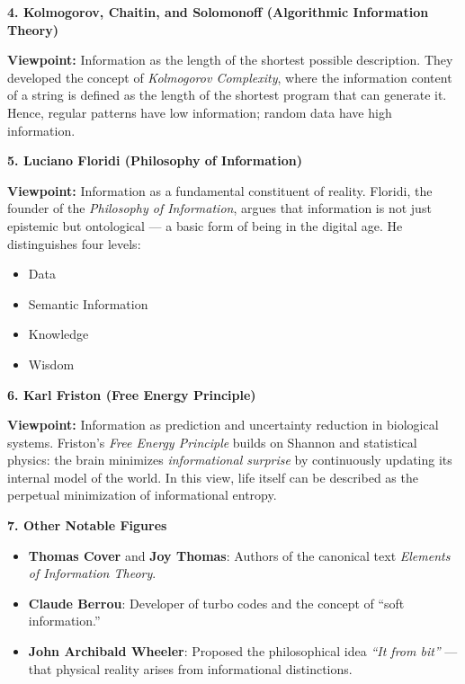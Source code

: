 \documentclass{book}
\providecommand{\ProjectDeepHeading}[2]{%
    \par\medskip\noindent\textbf{#2}\par\smallskip
}
\begin{document}
    \ProjectDeepHeading{2}{4. Kolmogorov, Chaitin, and Solomonoff (Algorithmic Information Theory)}
        \textbf{Viewpoint:} Information as the length of the shortest possible description.
        They developed the concept of \textit{Kolmogorov Complexity},
        where the information content of a string is defined as the length of the shortest program that can generate it.
        Hence, regular patterns have low information; random data have high information.
    
    \ProjectDeepHeading{2}{5. Luciano Floridi (Philosophy of Information)}
        \textbf{Viewpoint:} Information as a fundamental constituent of reality.
        Floridi, the founder of the \textit{Philosophy of Information}, argues that information is not just epistemic but ontological —
        a basic form of being in the digital age.
        He distinguishes four levels:
        \begin{itemize}
            \item Data
            \item Semantic Information
            \item Knowledge
            \item Wisdom
        \end{itemize}
    
    \ProjectDeepHeading{2}{6. Karl Friston (Free Energy Principle)}
        \textbf{Viewpoint:} Information as prediction and uncertainty reduction in biological systems.
        Friston’s \textit{Free Energy Principle} builds on Shannon and statistical physics:
        the brain minimizes \emph{informational surprise} by continuously updating its internal model of the world.
        In this view, life itself can be described as the perpetual minimization of informational entropy.
    
    \ProjectDeepHeading{2}{7. Other Notable Figures}
        \begin{itemize}
            \item \textbf{Thomas Cover} and \textbf{Joy Thomas}: Authors of the canonical text \textit{Elements of Information Theory}.
            \item \textbf{Claude Berrou}: Developer of turbo codes and the concept of ``soft information.''
            \item \textbf{John Archibald Wheeler}: Proposed the philosophical idea \textit{``It from bit''} — that physical reality arises from informational distinctions.
        \end{itemize}
    
\end{document}
